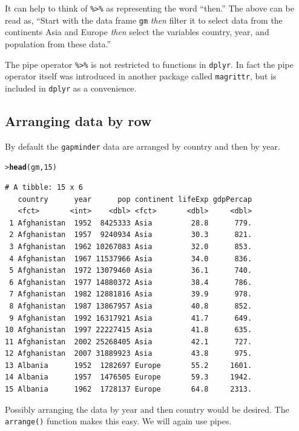 \documentclass[12pt,oneside]{book}\usepackage[]{graphicx}\usepackage[]{color}
\makeatletter
\newcommand{\hlnum}[1]{\textcolor[rgb]{0.686,0.059,0.569}{#1}}%
\newcommand{\hlstd}[1]{\textcolor[rgb]{0.345,0.345,0.345}{#1}}%
\newcommand{\hlkwd}[1]{\textcolor[rgb]{0.737,0.353,0.396}{\textbf{#1}}}%
\newenvironment{kframe}{%
 \def\at@end@of@kframe{}%
 \ifinner\ifhmode%
  \def\at@end@of@kframe{\end{minipage}}%
  \begin{minipage}{\columnwidth}%
 \fi\fi%
 \def\FrameCommand##1{\hskip\@totalleftmargin \hskip-\fboxsep
 \colorbox{shadecolor}{##1}\hskip-\fboxsep
     \hskip-\linewidth \hskip-\@totalleftmargin \hskip\columnwidth}%
 \MakeFramed {\advance\hsize-\width
   \@totalleftmargin\z@ \linewidth\hsize
   \@setminipage}}%
 {\par\unskip\endMakeFramed%
 \at@end@of@kframe}
\newenvironment{knitrout}{}{} %
\makeatother
\begin{document}
It can help to think of \verb+%>%+ as representing the word ``then.'' The above can be read as, ``Start with the data frame \verb+gm+ \emph{then} filter it to select data from the continents Asia and Europe \emph{then} select the variables country, year, and population from these data.''

The pipe operator \verb+%>%+ is not restricted to functions in \verb+dplyr+. In fact the pipe operator itself was introduced in another package called \verb+magrittr+, but is included in \verb+dplyr+ as a convenience.

\subsection{Arranging data by row}
By default the \verb+gapminder+ data are arranged by country and then by year. 
\begin{knitrout}
\color{fgcolor}\begin{kframe}
\begin{alltt}
\hlstd{> }\hlkwd{head}\hlstd{(gm,} \hlnum{15}\hlstd{)}
\end{alltt}
\begin{verbatim}
# A tibble: 15 x 6
   country      year      pop continent lifeExp gdpPercap
   <fct>       <int>    <dbl> <fct>       <dbl>     <dbl>
 1 Afghanistan  1952  8425333 Asia         28.8      779.
 2 Afghanistan  1957  9240934 Asia         30.3      821.
 3 Afghanistan  1962 10267083 Asia         32.0      853.
 4 Afghanistan  1967 11537966 Asia         34.0      836.
 5 Afghanistan  1972 13079460 Asia         36.1      740.
 6 Afghanistan  1977 14880372 Asia         38.4      786.
 7 Afghanistan  1982 12881816 Asia         39.9      978.
 8 Afghanistan  1987 13867957 Asia         40.8      852.
 9 Afghanistan  1992 16317921 Asia         41.7      649.
10 Afghanistan  1997 22227415 Asia         41.8      635.
11 Afghanistan  2002 25268405 Asia         42.1      727.
12 Afghanistan  2007 31889923 Asia         43.8      975.
13 Albania      1952  1282697 Europe       55.2     1601.
14 Albania      1957  1476505 Europe       59.3     1942.
15 Albania      1962  1728137 Europe       64.8     2313.
\end{verbatim}
\end{kframe}
\end{knitrout}
Possibly arranging the data by year and then country would be desired. The \verb+arrange()+ function makes this easy. We will again use pipes.
\end{document}
